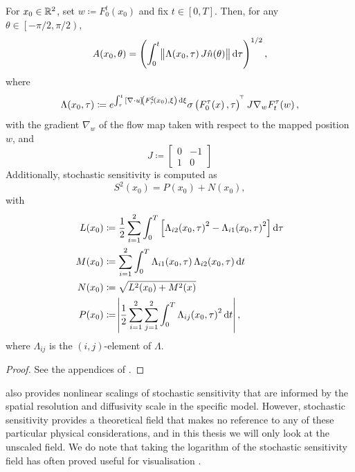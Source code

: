 \begin{theorem}\label{thm:orig_s2_calculation}
	For \(x_0 \in \mathbb{R}^2\), set \(w \coloneqq F_0^t\!\left(x_0\right)\) and fix \(t \in [0,T]\).
	Then, for any \(\theta \in \left[-\pi/2, \pi/2\right)\),
	\[
		A\!\left(x_0,\theta\right) = \left(\int_0^t{\norm{\Lambda\!\left(x_0, \tau\right)J\hat{n}\!\left(\theta\right)}\dif \tau}\right)^{1/2},
	\]
	where
	\[
		\Lambda\!\left(x_0,\tau\right) \coloneqq e^{\int_\tau^t{\left[\nabla \cdot u\right]\!\left(F_\tau^\xi\!\left(x_0\right), \xi\right)\dif\xi}}\sigma\left(F_0^\tau\!\left(x\right), \tau\right)^{\T} J \nabla_w F_t^\tau\!\left(w\right),
	\]
	with the gradient \(\nabla_w\) of the flow map taken with respect to the mapped position \(w\), and
	\[
		J \coloneqq \begin{bmatrix}
			0 & -1 \\
			1 & 0
		\end{bmatrix}
	\]
	Additionally, stochastic sensitivity is computed as
	\[
		S^2\!\left(x_0\right) = P\!\left(x_0\right) + N\!\left(x_0\right),
	\]
	with
	\begin{align*}
		L\!\left(x_0\right) & \coloneqq \frac12\sum_{i=1}^2\int_0^T\left[\Lambda_{i2}\!\left(x_0,\tau\right)^2 - \Lambda_{i1}\!\left(x_0,\tau\right)^2\right]\dif\tau \\
		M\!\left(x_0\right) & \coloneqq \sum_{i=1}^2\int_0^T{\Lambda_{i1}\!\left(x_0,\tau\right)\Lambda_{i2}\!\left(x_0,\tau\right)\dif t}                            \\
		N\!\left(x_0\right) & \coloneqq \sqrt{L^2\!\left(x_0\right) + M^2(x)}                                                                                         \\
		P\!\left(x_0\right) & \coloneqq \abs{\frac12\sum_{i=1}^2\sum_{j=1}^2{\int_0^T{\Lambda_{ij}\!\left(x_0,\tau\right)^2\dif t}}},
	\end{align*}
	where \(\Lambda_{ij}\) is the \((i,j)\)-element of \(\Lambda\).
\end{theorem}
\begin{proof}
	See the appendices of \citet{Balasuriya_2020_StochasticSensitivityComputable}.
\end{proof}

\citet{Balasuriya_2020_StochasticSensitivityComputable} also provides nonlinear scalings of stochastic sensitivity that are informed by the spatial resolution and diffusivity scale in the specific model.
However, stochastic sensitivity provides a theoretical field that makes no reference to any of these particular physical considerations, and in this thesis we will only look at the unscaled field.
We do note that taking the logarithm of the stochastic sensitivity field has often proved useful for visualisation \citep[e.g.]{BadzaEtAl_2023_HowSensitiveAre}.

